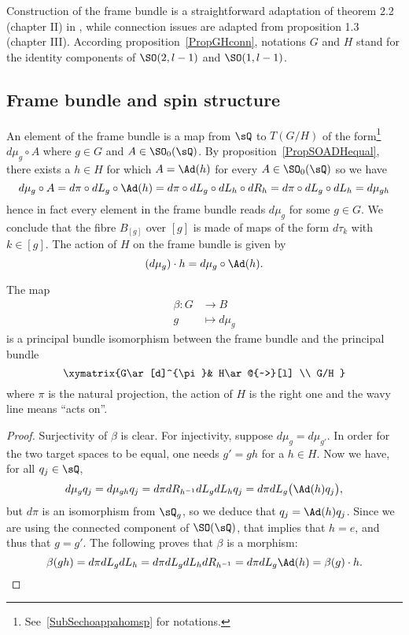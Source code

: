 Construction of the frame bundle is a straightforward adaptation of theorem 2.2 (chapter II) in \cite{AnnikFranc}, while connection issues are adapted from proposition 1.3 (chapter III).  According proposition~\ref{PropGHconn}, notations $G$ and $H$ stand for the identity components of $\SO(2,l-1)$ and $\SO(1,l-1)$.

\subsection{Frame bundle and spin structure}

An element of the frame bundle is a map from $\sQ$ to $T(G/H)$ of the form\footnote{See~\ref{SubSechoappahomsp} for notations.} $d\mu_g\circ A$ where $g\in G$ and $A\in \SO_0(\sQ)$. By proposition~\ref{PropSOADHequal}, there exists a $h\in H$ for which $A=\Ad(h)$ for every $A\in\SO_0(\sQ)$ so we have
\[
	d\mu_g\circ A=d\pi\circ dL_g\circ\Ad(h)=d\pi\circ dL_g \circ dL_h\circ dR_h=d\pi\circ dL_g \circ dL_h=d\mu_{gh}
\]
hence in fact every element in the frame bundle reads $d\mu_g$ for some $g\in G$. We conclude that the fibre $B_{[g]}$ over $[g]$ is made of maps of the form $d\tau_k$ with $k\in[g]$. The action of $H$ on the frame bundle is given by
\[
	(d\mu_g)\cdot h=d\mu_g\circ\Ad(h).
\]

\begin{proposition}
	The map
	\begin{equation}
		\begin{aligned}
			\beta\colon G & \to B          \\
			g             & \mapsto d\mu_g
		\end{aligned}
	\end{equation}
	is a principal bundle isomorphism between the frame bundle and the principal bundle
	\begin{equation}        \label{PrincHGGH}
		\xymatrix{%
			G\ar[d]^{\pi}& H\ar@{~>}[l]     \\
			G/H
		}
	\end{equation}
	where $\pi$ is the natural projection, the action of $H$ is the right one and the wavy line means ``acts on''.
\end{proposition}

\begin{proof}
	Surjectivity of $\beta$ is clear. For injectivity, suppose $d\mu_g=d\mu_{g'}$. In order for the two target spaces to be equal, one needs $g'=gh$ for a $h\in H$. Now we have, for all $q_j\in\sQ$,
	\begin{equation}
		d\mu_gq_j=d\mu_{gh}q_j=d\pi dR_{h^{-1}}dL_gdL_hq_j
		=d\pi dL_g\big( \Ad(h)q_j \big),
	\end{equation}
	but $d\pi$ is an isomorphism from $\sQ_g$, so we deduce that $q_j=\Ad(h)q_j$. Since we are using the connected component of $\SO(\sQ)$, that implies that $h=e$, and thus that $g=g'$. The following proves that $\beta$ is a morphism:
	\[
		\beta(gh)=d\pi dL_g dL_h=d\pi dL_g dL_h dR_{h^{-1}}=d\pi dL_g \Ad(h)=\beta(g)\cdot h.
	\]
\end{proof}

